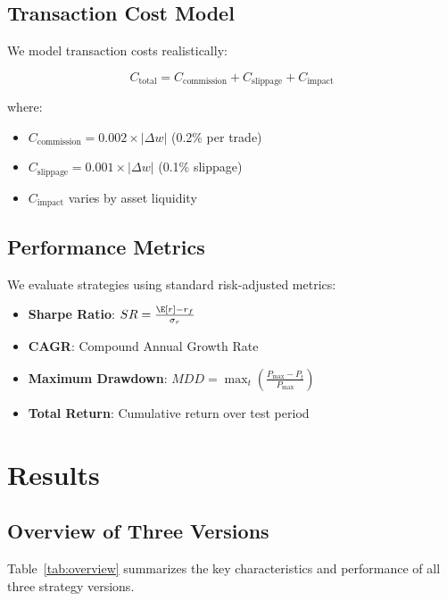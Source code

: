 \documentclass[twocolumn,ieee]{arithmaxresearch}
\begin{document}
\subsection{Transaction Cost Model}

We model transaction costs realistically:

\begin{equation}
C_{\text{total}} = C_{\text{commission}} + C_{\text{slippage}} + C_{\text{impact}}
\end{equation}

where:
\begin{itemize}
    \item $C_{\text{commission}} = 0.002 \times |\Delta w|$ (0.2\% per trade)
    \item $C_{\text{slippage}} = 0.001 \times |\Delta w|$ (0.1\% slippage)
    \item $C_{\text{impact}}$ varies by asset liquidity
\end{itemize}

\subsection{Performance Metrics}

We evaluate strategies using standard risk-adjusted metrics:

\begin{itemize}
    \item \textbf{Sharpe Ratio}: $SR = \frac{\E[r] - r_f}{\sigma_r}$
    \item \textbf{CAGR}: Compound Annual Growth Rate
    \item \textbf{Maximum Drawdown}: $MDD = \max_{t} \left(\frac{P_{\max} - P_t}{P_{\max}}\right)$
    \item \textbf{Total Return}: Cumulative return over test period
\end{itemize}

\section{Results}

\subsection{Overview of Three Versions}

Table~\ref{tab:overview} summarizes the key characteristics and performance of all three strategy versions.
\end{document}
